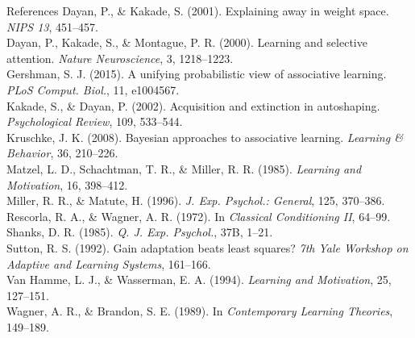 \documentclass[aspectratio=169,11pt]{beamer}
\begin{document}
\appendix
\begin{frame}[allowframebreaks]{References}
\scriptsize
Dayan, P., \& Kakade, S. (2001). Explaining away in weight space. \emph{NIPS 13}, 451--457.\\
Dayan, P., Kakade, S., \& Montague, P. R. (2000). Learning and selective attention. \emph{Nature Neuroscience}, 3, 1218--1223.\\
Gershman, S. J. (2015). A unifying probabilistic view of associative learning. \emph{PLoS Comput. Biol.}, 11, e1004567.\\
Kakade, S., \& Dayan, P. (2002). Acquisition and extinction in autoshaping. \emph{Psychological Review}, 109, 533--544.\\
Kruschke, J. K. (2008). Bayesian approaches to associative learning. \emph{Learning \& Behavior}, 36, 210--226.\\
Matzel, L. D., Schachtman, T. R., \& Miller, R. R. (1985). \emph{Learning and Motivation}, 16, 398--412.\\
Miller, R. R., \& Matute, H. (1996). \emph{J. Exp. Psychol.: General}, 125, 370--386.\\
Rescorla, R. A., \& Wagner, A. R. (1972). In \emph{Classical Conditioning II}, 64--99.\\
Shanks, D. R. (1985). \emph{Q. J. Exp. Psychol.}, 37B, 1--21.\\
Sutton, R. S. (1992). Gain adaptation beats least squares? \emph{7th Yale Workshop on Adaptive and Learning Systems}, 161--166.\\
Van Hamme, L. J., \& Wasserman, E. A. (1994). \emph{Learning and Motivation}, 25, 127--151.\\
Wagner, A. R., \& Brandon, S. E. (1989). In \emph{Contemporary Learning Theories}, 149--189.
\end{frame}
\end{document}
